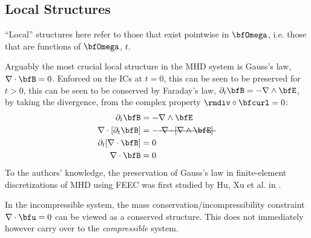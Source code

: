 \subsection*{Local Structures}
    ``Local'' structures here refer to those that exist pointwise in $\bfOmega$, i.e. those that are functions of $\bfOmega$, $t$.
    
    Arguably the most crucial local structure in the MHD system is Gauss's law, $\nabla\cdot\bfB  =  0$. Enforced on the ICs at $t  =  0$, this can be seen to be preserved for $t  >  0$, this can be seen to be conserved by Faraday's law, $\partial_{t}\bfB  =  - \nabla\wedge\bfE$, by taking the divergence, from the complex property $\rmdiv\circ\bfcurl  =  0$: \cite{Stratton_1941, Rosen_1980, Freistühler_Warnecke_2002}
    \begin{align}
                    \partial_{t}\bfB   &=  - \nabla\wedge\bfE  \\
        \nabla\cdot[\partial_{t}\bfB]  &=  - \mst{\nabla\cdot[\nabla\wedge\bfE]}  \\
        \partial_{t}[\nabla\cdot\bfB]  &=  0  \\
                     \nabla\cdot\bfB   &=  0
    \end{align}
    To the authors' knowledge, the preservation of Gauss's law in finite-element discretizations of MHD using FEEC was first studied by Hu, Xu et al. in \cite{Hu_Xu_2015, Hu_Ma_Xu_2017}.

    \begin{remark}
        In the incompressible system, the mass conservation/incompressibility constraint $\nabla\cdot\bfu  =  0$ can be viewed as a conserved structure. This does not immediately however carry over to the \emph{compressible} system.
    \end{remark}
